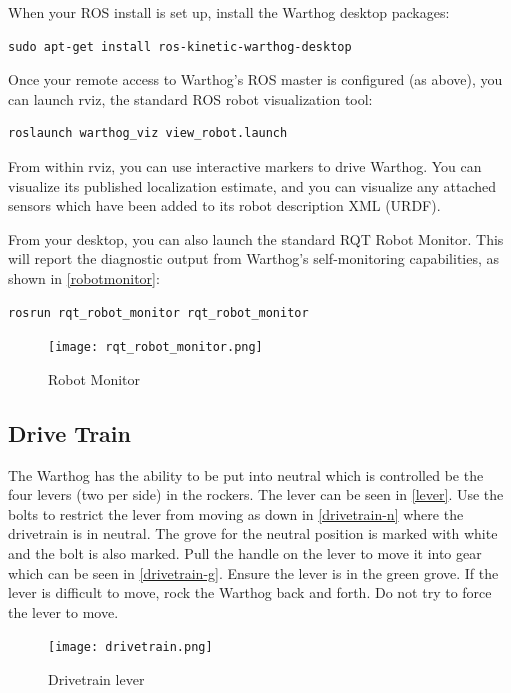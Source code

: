 \documentclass[]{clearpath-latex/clearpath-manual}
\begin{document}
When your ROS install is set up, install the Warthog desktop packages:

\begin{lstlisting}
sudo apt-get install ros-kinetic-warthog-desktop
\end{lstlisting}

Once your remote access to Warthog's ROS master is configured (as above), you can launch rviz, the standard ROS robot visualization tool:

\begin{lstlisting}
roslaunch warthog_viz view_robot.launch
\end{lstlisting}

From within rviz, you can use interactive markers to drive Warthog. You can visualize its published localization estimate, and you can visualize any attached sensors which have been added to its robot description XML (URDF).

\pagebreak[4]

From your desktop, you can also launch the standard RQT Robot Monitor. This will report the diagnostic output from Warthog's self-monitoring capabilities, as shown in \autoref{robotmonitor}:

\begin{lstlisting}
rosrun rqt_robot_monitor rqt_robot_monitor
\end{lstlisting}

\begin{figure}[!htb]
  \centering
  \texttt{[image: rqt\_robot\_monitor.png]}
  \caption{Robot Monitor}
  \label{robotmonitor}
\end{figure}


\subsection{Drive Train}

The Warthog has the ability to be put into neutral which is controlled be the four levers (two per side) in the rockers.  The lever can be seen in \autoref{lever}.  Use the bolts to restrict the lever from moving as down in \autoref{drivetrain-n} where the drivetrain is in neutral.  The grove for the neutral position is marked with white and the bolt is also marked.  Pull the handle on the lever to move it into gear which can be seen in \autoref{drivetrain-g}.  Ensure the lever is in the green grove.  If the lever is difficult to move, rock the Warthog back and forth.  Do not try to force the lever to move.

\begin{figure}[!htb]
  \centering
  \texttt{[image: drivetrain.png]}
  \caption{Drivetrain lever}
  \label{lever}
\end{figure}
\end{document}
